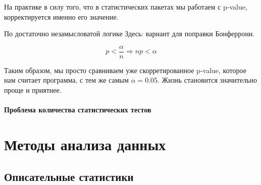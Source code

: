 \documentclass[
  letterpaper,
  DIV=11,
  numbers=noendperiod]{scrreprt}
\newcommand{\const}{\text{const}}
\newcommand{\lp}{\left(}
\newcommand{\rp}{\right)}
\newcommand{\lb}{\left[}
\newcommand{\rb}{\right]}
\newcommand*\circled[1]{\tikz[baseline=(char.base)]{
            \node[shape=circle,draw,inner sep=2pt] (char) {#1};}}
\newcommand{\xor}{\,\text{XOR}\,}
\newcommand{\setN}{\mathbb{N}}
\newcommand{\setNo}{\mathbb{N}_{0}}
\newcommand{\setZ}{\mathbb{Z}}
\newcommand{\setQ}{\mathbb{Q}}
\newcommand{\setR}{\mathbb{R}}
\newcommand{\setC}{\mathbb{C}}
\newcommand{\vm}[1]{\mathbf{#1}} %
\newcommand{\prob}{\mathbb{P}}
\newcommand{\expect}{\mathbb{E}}
\newcommand{\disp}{\mathbb{D}}
\newcommand{\var}{\mathrm{var}}
\newcommand{\cov}{\mathrm{cov}}
\newcommand{\cor}{\mathrm{cor}}
\newcommand{\se}{\mathrm{se}}
\newcommand{\sd}{\mathrm{sd}}
\newcommand{\iid}{\text{i.i.d}}
\theoremstyle{definition}
\theoremstyle{remark}
\begin{document}
На практике в силу того, что в статистических пакетах мы работаем с
p-value, корректируется именно его значение.

По достаточно незамысловатой логике Здесь: вариант для поправки
Бонферрони.

\[
p < \frac{\alpha}{n} \Rightarrow np < \alpha
\]

Таким образом, мы просто сравниваем уже скорретированное p-value,
которое нам считает программа, с тем же самым \(\alpha = 0.05\). Жизнь
становится значительно проще и приятнее.

\subsection{Проблема количества статистических
тестов}\label{stats-testing-multiple-testing}

\part{Методы анализа данных}


\chapter{Описательные статистики}\label{andan-descriptives}

\usepackage{xcolor}
\usepackage{soul}
\usepackage{amsmath, amsfonts}

\newcommand{\const}{\text{const}}
\newcommand{\lp}{\left(}
\newcommand{\rp}{\right)}
\newcommand{\lb}{\left[}
\newcommand{\rb}{\right]}

\newcommand*\circled[1]{\tikz[baseline=(char.base)]{
            \node[shape=circle,draw,inner sep=2pt] (char) {#1};}}

\newcommand{\xor}{\,\text{XOR}\,}

\newcommand{\setN}{\mathbb{N}}
\newcommand{\setNo}{\mathbb{N}_{0}}
\newcommand{\setZ}{\mathbb{Z}}
\newcommand{\setQ}{\mathbb{Q}}
\newcommand{\setR}{\mathbb{R}}
\newcommand{\setC}{\mathbb{C}}

\newcommand{\vm}[1]{\mathbf{#1}}

\newcommand{\Falg}{\mathcal{F}}
\newcommand{\prob}{\mathbb{P}}
\newcommand{\expect}{\mathbb{E}}
\newcommand{\disp}{\mathbb{D}}
\newcommand{\var}{\text{var}}
\newcommand{\cov}{\text{cov}}
\newcommand{\cor}{\text{cor}}
\newcommand{\se}{\text{se}}
\newcommand{\sd}{\text{sd}}
\newcommand{\iid}{\text{i.i.d}}
\end{document}
